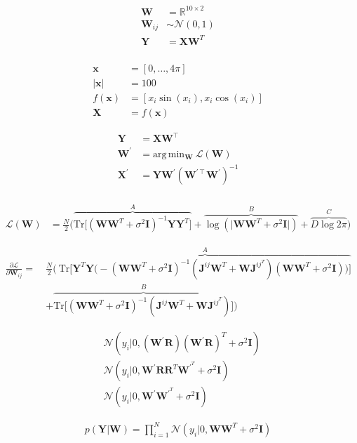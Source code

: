 \begin{align*}
\textbf{W} &= \mathbb{R}^{10\times2} \\
\textbf{W}_{ij} &\sim \mathcal{N}(0,1) \\
\textbf{Y} &= \textbf{X}\textbf{W}^T \\
\end{align*}

\begin{align*}
\textbf{x} &= [0,\ldots,4\pi] \\
\lvert\textbf{x}\rvert &= 100 \\
f(\textbf{x}) &= [x_i \sin(x_i), x_i \cos(x_i)] \\
\textbf{X} &= f(\textbf{x})
\end{align*}

\begin{align*}
\textbf{Y} &= \textbf{X}\textbf{W}^\intercal \\
\textbf{W}^\prime &= \text{arg}\,\text{min}_\textbf{W}\ \mathcal{L}(\mathbf{W}) \\
\textbf{X}^\prime &= \textbf{Y}\textbf{W}^\prime(\textbf{W}^{\prime\intercal}\textbf{W}^\prime)^{-1} \\
\end{align*}

\begin{align*}
\mathcal{L}(\textbf{W}) &= \frac{N}{2}\bigg(\overbrace{\text{Tr}\Big[(\textbf{W}\textbf{W}^T+\sigma^2\textbf{I})^{-1}\textbf{Y}\textbf{Y}^T\Big]}^{A} + \overbrace{\log(\lvert\textbf{W}\textbf{W}^T+\sigma^2\textbf{I}\vert)}^{B} + \overbrace{D\log2\pi}^{C}\bigg)
\end{align*}

\begin{align*}
\frac{\partial\mathcal{L}}{\partial\textbf{W}_{ij}} =\ &\frac{N}{2}\Bigg(\ \overbrace{\text{Tr}\Big[\textbf{Y}^T\textbf{Y}\big(-(\textbf{W}\textbf{W}^T+\sigma^2\textbf{I})^{-1}(\textbf{J}^{ij}\textbf{W}^T + \textbf{W}\textbf{J}^{ij}^T)(\textbf{W}\textbf{W}^T+\sigma^2\textbf{I})\big)\Big]}^{A} \\ 
	&+ \overbrace{\text{Tr}\Big[(\textbf{W}\textbf{W}^T+\sigma^2\textbf{I})^{-1}(\textbf{J}^{ij}\textbf{W}^T + \textbf{W}\textbf{J}^{ij}^T)\Big]}^{B}\Bigg)
\end{align*}

\begin{align*}
&\mathcal{N}(y_i|0,(\textbf{W}^\prime\textbf{R})(\textbf{W}^\prime\textbf{R})^T + \sigma^2\textbf{I}) \\
&\mathcal{N}(y_i|0,\textbf{W}^\prime\textbf{R}\textbf{R}^T\textbf{W}^\prime^T + \sigma^2\textbf{I}) \\
&\mathcal{N}(y_i|0,\textbf{W}^\prime\textbf{W}^\prime^T + \sigma^2\textbf{I})
\end{align*}

\begin{align*}
p(\textbf{Y}|\textbf{W}) = \prod_{i=1}^N\mathcal{N}(y_i|0,\textbf{W}\textbf{W}^T + \sigma^2\textbf{I})
\end{align*}
